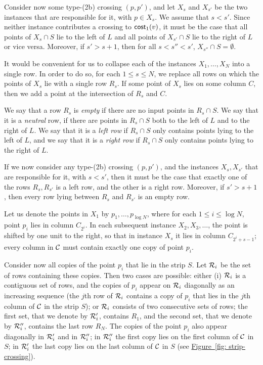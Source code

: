 \documentclass[11pt]{article}
\numberwithin{equation}{section}
\theoremstyle{definition}
\theoremstyle{plain}
\newcommand{\expref}[2]{\hyperref[#2]{#1~\ref{#2}}}
\begin{document}
Consider now some type-(2b) crossing $(p,p')$, and let $X_s$ and $X_{s'}$ be the two instances that are responsible for it, with $p\in X_s$. We assume that $s<s'$. Since neither instance contributes a crossing to $\mathsf{cost}_1(v)$, it must be the case that all points of $X_s\cap S$ lie to the left of $L$ and all points of $X_{s'}\cap S$ lie to the right of $L$ or vice versa.
Moreover, if $s'>s+1$, then for all $s<s''<s'$, $X_{s''}\cap S=\emptyset$.

It would be convenient for us to collapse each of the instances $X_1,\ldots,X_{N}$ into a single row. In order to do so, for each $1\leq s\leq N$, we replace all rows on which the points of $X_s$ lie with a single row $R_s$. If some point of $X_s$ lies on some column $C$, then we add a point at the intersection of $R_s$ and $C$.

We say that a row $R_s$ is \emph{empty} if there are no input points in $R_s\cap S$. We say that it is a \emph{neutral} row, if there are points in $R_s\cap S$ both to the left of $L$ and to the right of $L$. We say that it is a \emph{left row} if $R_s\cap S$ only contains points lying to the left of $L$, and we say that it is a \emph{right row} if $R_s\cap S$ only contains points lying to the right of $L$.

If we now consider any type-(2b) crossing $(p,p')$, and the instances $X_s,X_{s'}$ that are responsible for it, with $s<s'$, then it must be the case that exactly one of the rows $R_s,R_{s'}$ is a left row, and the other is a right row. Moreover, if $s'>s+1$, then every row lying between $R_s$ and $R_{s'}$ is an empty row.

Let us denote the points in $X_1$ by $p_1,\ldots,p_{\log N}$, where for each $1\leq i\leq \log N$, point $p_i$ lies in column $C_{2^i}$. 
In each subsequent instance $X_2,X_3,\ldots$, the point is shifted by one unit to the right, so that in instance $X_s$ it lies in column $C_{2^i+s-1}$; every column in ${\mathcal C}$ must contain exactly one copy of point $p_i$.

Consider now all copies of the point $p_i$ that lie in the strip $S$. Let ${\mathcal R}_i$ be the set of rows containing these copies. Then two cases are possible: either (i) ${\mathcal R}_i$ is a contiguous set of rows, and the copies of $p_i$ appear on ${\mathcal R}_i$ diagonally as an increasing sequence (the $j$th row of ${\mathcal R}_i$ contains a copy of $p_i$ that lies in the $j$th column of ${\mathcal C}$ in the strip $S$); or ${\mathcal R}_i$ consists of two consecutive sets of rows; the first set, that we denote by ${\mathcal R}'_i$, contains $R_1$, and the second set, that we denote by ${\mathcal R}''_i$, contains the last row $R_{N}$. The copies of the point $p_i$ also appear diagonally in ${\mathcal R}'_i$ and in ${\mathcal R}''_i$; in ${\mathcal R}''_i$ the first copy lies on the first column of ${\mathcal C}$ in $S$; in ${\mathcal R}'_i$ the last copy lies on the last column of ${\mathcal C}$ in $S$ (see \expref{Figure}{fig: strip-crossing}).
\end{document}
